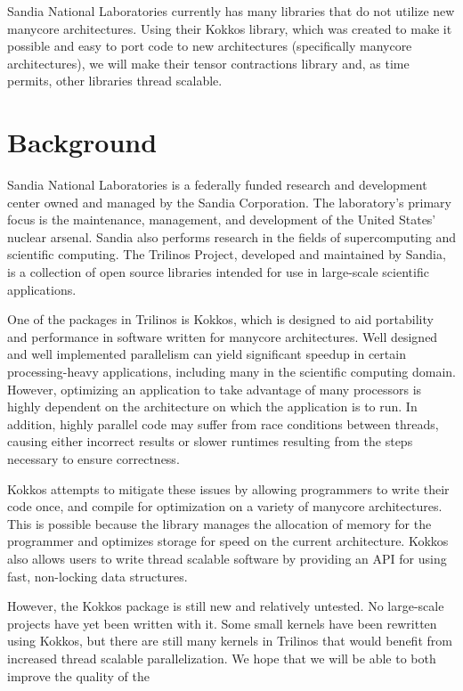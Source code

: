 \documentclass[proposal]{hmcclinic}
\begin{document}
Sandia National Laboratories currently has many libraries that do not utilize new manycore architectures. Using their Kokkos library, which was created to make it possible and easy to port code to new architectures (specifically manycore architectures), we will make their tensor contractions library and, as time permits, other libraries thread scalable.


\section{Background}

Sandia National Laboratories is a federally funded research and development
center owned and managed by the Sandia Corporation.  The laboratory's primary
focus is the maintenance, management, and development of the United States'
nuclear arsenal.  Sandia also performs research in the fields of supercomputing
and scientific computing.  The Trilinos Project, developed and maintained by
Sandia, is a collection of open source libraries intended for use in large-scale
scientific applications.

One of the packages in Trilinos is Kokkos, which is designed to aid portability
and performance in software written for manycore architectures.  Well designed
and well implemented parallelism can yield significant speedup in certain
processing-heavy applications, including many in the scientific computing
domain.  However, optimizing an application to take advantage of many processors
is highly dependent on the architecture on which the application is to run.  In
addition, highly parallel code may suffer from race conditions between threads,
causing either incorrect results or slower runtimes resulting from the steps
necessary to ensure correctness.

Kokkos attempts to mitigate these issues by allowing programmers to
write their code once, and compile for optimization on a variety of
manycore architectures.  This is possible because the library manages the
allocation of memory for the programmer and optimizes storage for speed on
the current architecture. Kokkos also allows users to write thread scalable
software by providing an API for using fast, non-locking data structures. 

However, the Kokkos package is still new and relatively untested.  No
large-scale projects have yet been written with it.  Some small kernels
have been rewritten using Kokkos, but there are still many kernels in Trilinos
that would benefit from increased thread scalable parallelization. We hope that
we will be able to both improve the quality of the 
\end{document}
